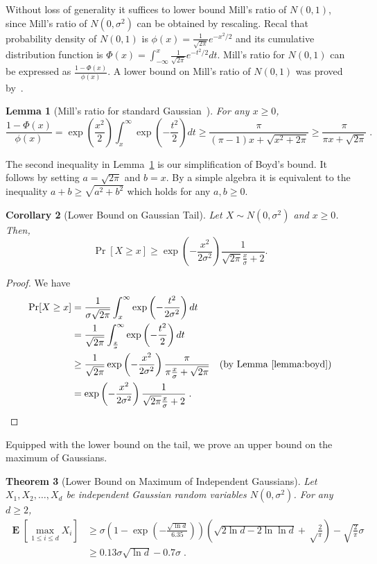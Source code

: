 \documentclass{article}
\DeclareMathOperator*{\Exp}{\mathbf{E}}
\newtheorem{theorem}{Theorem}
\newtheorem{lemma}[theorem]{Lemma}
\newtheorem{corollary}[theorem]{Corollary}
\begin{document}
Without loss of generality it suffices to lower bound Mill's ratio of $N(0,1)$,
since Mill's ratio of $N(0,\sigma^2)$ can be obtained by rescaling.  Recal that
probability density of $N(0,1)$ is $\phi(x) = \frac{1}{\sqrt{2 \pi}}
e^{-x^2/2}$ and its cumulative distribution function is $\Phi(x) =
\int_{-\infty}^x \frac{1}{\sqrt{2 \pi}} e^{-t^2/2} dt$.  Mill's ratio for
$N(0,1)$ can be expressed as $\frac{1 - \Phi(x)}{\phi(x)}$. A lower bound on
Mill's ratio of $N(0,1)$ was proved by~\cite{Boyd-1959}.

\begin{lemma}[Mill's ratio for standard Gaussian~\citep{Boyd-1959}]
\label{lemma:boyd}
For any $x \ge 0$,
$$
\frac{1 - \Phi(x)}{\phi(x)}
= \exp\left(\frac{x^2}{2}\right) \int_x^{\infty} \exp\left(-\frac{t^2}{2}\right) dt
\ge \frac{\pi}{(\pi-1)x+\sqrt{x^2+2 \pi}}
\ge \frac{\pi}{\pi x + \sqrt{2\pi}} \; .
$$
\end{lemma}
The second inequality in Lemma~\ref{lemma:boyd} is our simplification of Boyd's
bound.  It follows by setting $a=\sqrt{2 \pi}$ and $b=x$. By a simple algebra
it is equivalent to the inequality $a + b \ge \sqrt{a^2 + b^2}$ which holds for
any $a,b \ge 0$.

\begin{corollary}[Lower Bound on Gaussian Tail]
Let $X \sim N(0, \sigma^2)$ and $x \ge 0$. Then,
$$
\Pr[X \ge x] \ge \exp\left(-\frac{x^2}{2 \sigma^2}\right) \frac{1}{\sqrt{2\pi}\frac{x}{\sigma}+2}.
$$
\end{corollary}

\begin{proof}
We have
\begin{align*}
\Pr[X \ge x]
& = \frac{1}{\sigma \sqrt{2 \pi}} \int_x^{\infty} \exp \left( -\frac{t^2}{2 \sigma^2} \right) d t \\
& = \frac{1}{\sqrt{2 \pi}} \int_\frac{x}{\sigma}^{\infty} \exp \left( -\frac{t^2}{2} \right) d t \\
& \ge \frac{1}{\sqrt{2 \pi}} \exp\left(-\frac{x^2}{2 \sigma^2}\right) \frac{\pi}{\pi\frac{x}{\sigma}+\sqrt{2 \pi}} & \text{(by Lemma~\ref{lemma:boyd})} \\
& = \exp\left(-\frac{x^2}{2 \sigma^2}\right) \frac{1}{\sqrt{2\pi}\frac{x}{\sigma}+2} \; .
\end{align*}
\end{proof}

Equipped with the lower bound on the tail, we prove an upper bound on the maximum of Gaussians.

\begin{theorem}[Lower Bound on Maximum of Independent Gaussians]
Let $X_1, X_2, \dots, X_d$ be independent Gaussian random variables $N(0,\sigma^2)$. For any $d \ge 2$,
\begin{align}
\Exp \left[\max_{1 \le i \le d} X_i\right]
& \ge \sigma \left(1 - \exp\left(-\frac{\sqrt{\ln d}}{6.35}\right)\right) \left(\sqrt{2 \ln d - 2 \ln \ln d} +\sqrt\frac{2}{\pi}\right) -\sqrt{\frac{2}{\pi}} \sigma \label{equation:maximum-of-gaussians-lower-bound-1} \\
& \ge 0.13 \sigma \sqrt{\ln d} - 0.7 \sigma \label{equation:maximum-of-gaussians-lower-bound-2} \; .
\end{align}
\end{theorem}
\end{document}

